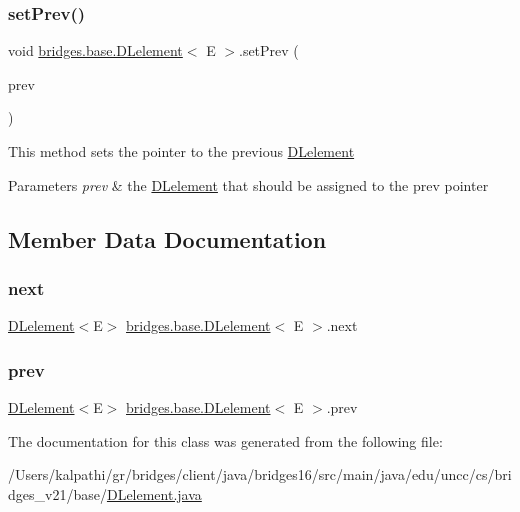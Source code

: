 \subsubsection{\texorpdfstring{set\+Prev()}{setPrev()}}
{\footnotesize\ttfamily void \hyperlink{classbridges_1_1base_1_1_d_lelement}{bridges.\+base.\+D\+Lelement}$<$ E $>$.set\+Prev (\begin{DoxyParamCaption}\item[{\hyperlink{classbridges_1_1base_1_1_d_lelement}{D\+Lelement}$<$ E $>$}]{prev }\end{DoxyParamCaption})}

This method sets the pointer to the previous \hyperlink{classbridges_1_1base_1_1_d_lelement}{D\+Lelement} 
\begin{DoxyParams}{Parameters}
{\em prev} & the \hyperlink{classbridges_1_1base_1_1_d_lelement}{D\+Lelement} that should be assigned to the prev pointer \\
\hline
\end{DoxyParams}


\subsection{Member Data Documentation}
\hypertarget{classbridges_1_1base_1_1_d_lelement_ae2672f6718bf5e1758386d33e59d9340}{}\label{classbridges_1_1base_1_1_d_lelement_ae2672f6718bf5e1758386d33e59d9340} 
\subsubsection{\texorpdfstring{next}{next}}
{\footnotesize\ttfamily \hyperlink{classbridges_1_1base_1_1_d_lelement}{D\+Lelement}$<$E$>$ \hyperlink{classbridges_1_1base_1_1_d_lelement}{bridges.\+base.\+D\+Lelement}$<$ E $>$.next\hspace{0.3cm}{\ttfamily [protected]}}

\hypertarget{classbridges_1_1base_1_1_d_lelement_a6eba4876f820b75ac6bde01d7dea9da7}{}\label{classbridges_1_1base_1_1_d_lelement_a6eba4876f820b75ac6bde01d7dea9da7} 
\subsubsection{\texorpdfstring{prev}{prev}}
{\footnotesize\ttfamily \hyperlink{classbridges_1_1base_1_1_d_lelement}{D\+Lelement}$<$E$>$ \hyperlink{classbridges_1_1base_1_1_d_lelement}{bridges.\+base.\+D\+Lelement}$<$ E $>$.prev\hspace{0.3cm}{\ttfamily [protected]}}



The documentation for this class was generated from the following file\+:\begin{DoxyCompactItemize}
\item 
/\+Users/kalpathi/gr/bridges/client/java/bridges16/src/main/java/edu/uncc/cs/bridges\+\_\+v21/base/\hyperlink{_d_lelement_8java}{D\+Lelement.\+java}\end{DoxyCompactItemize}
